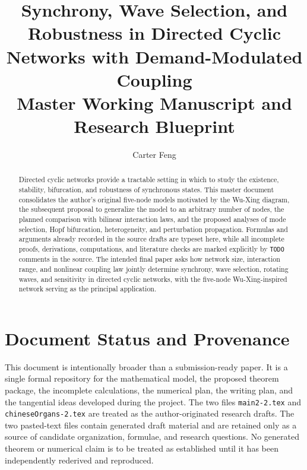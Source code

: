 \documentclass[11pt, reqno]{amsart}
\title[Directed Cyclic Networks]{Synchrony, Wave Selection, and Robustness in Directed Cyclic Networks with Demand-Modulated Coupling\\[0.4em]
\textnormal{\large Master Working Manuscript and Research Blueprint}}
\author{Carter Feng}
\theoremstyle{definition}
\theoremstyle{remark}
\begin{document}
\begin{abstract}
Directed cyclic networks provide a tractable setting in which to study the
existence, stability, bifurcation, and robustness of synchronous states.  This
master document consolidates the author's original five-node models motivated
by the Wu-Xing diagram, the subsequent proposal to generalize the model to an
arbitrary number of nodes, the planned comparison with bilinear interaction
laws, and the proposed analyses of mode selection, Hopf bifurcation,
heterogeneity, and perturbation propagation.  Formulas and arguments already
recorded in the source drafts are typeset here, while all incomplete proofs,
derivations, computations, and literature checks are marked explicitly by
\texttt{TODO} comments in the source.  The intended final paper asks how
network size, interaction range, and nonlinear coupling law jointly determine
synchrony, wave selection, rotating waves, and sensitivity in directed cyclic
networks, with the five-node Wu-Xing-inspired network serving as the principal
application.
\end{abstract}

\maketitle



\tableofcontents
\newpage

\section*{Document Status and Provenance}

This document is intentionally broader than a submission-ready paper.  It is a
single formal repository for the mathematical model, the proposed theorem
package, the incomplete calculations, the numerical plan, the writing plan,
and the tangential ideas developed during the project.  The two files
\texttt{main2-2.tex} and \texttt{chineseOrgans-2.tex} are treated as the
author-originated research drafts.  The two pasted-text files contain generated
draft material and are retained only as a source of candidate organization,
formulae, and research questions.  No generated theorem or numerical claim is
to be treated as established until it has been independently rederived and
reproduced.
\end{document}
